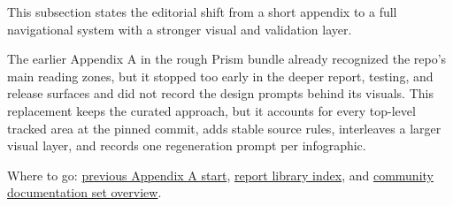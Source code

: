 This subsection states the editorial shift from a short appendix to a
full navigational system with a stronger visual and validation layer.

The earlier Appendix A in the rough Prism bundle already recognized the
repo's main reading zones, but it stopped too early in the deeper
report, testing, and release surfaces and did not record the design
prompts behind its visuals. This replacement keeps the curated approach,
but it accounts for every top-level tracked area at the pinned commit,
adds stable source rules, interleaves a larger visual layer, and records
one regeneration prompt per infographic.

Where to go:
\href{https://github.com/chris-page-gov/mcp-geo/blob/fe862910da246ca77f374cfbe484985f5df4d316/docs/mcp_geo_prism_bundle/main.md\#L122-L292}{previous
Appendix A start},
\href{https://github.com/chris-page-gov/mcp-geo/blob/fe862910da246ca77f374cfbe484985f5df4d316/docs/reports/README.md\#L1-L71}{report
library index}, and
\href{https://github.com/chris-page-gov/mcp-geo/blob/fe862910da246ca77f374cfbe484985f5df4d316/docs/public_sector_ai_community/README.md\#L1-L60}{community
documentation set overview}.

